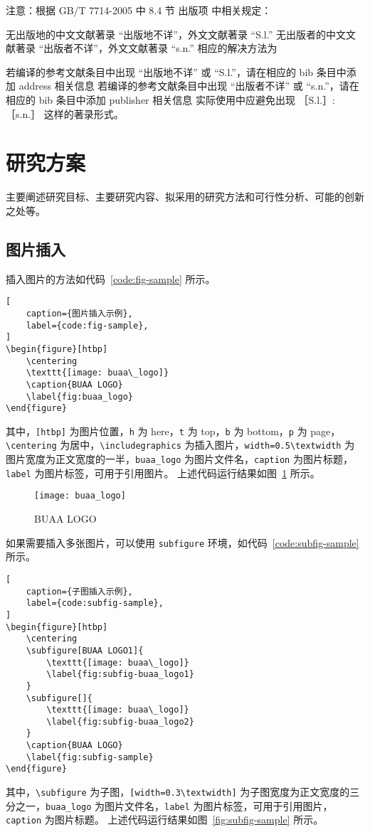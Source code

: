 \documentclass[master,AutoFakeBold=true]{buaathesisproposal}
\begin{document}
注意：根据 GB/T 7714-2005 中 8.4 节 出版项  中相关规定：

无出版地的中文文献著录 “出版地不详”，外文文献著录 “S.l.”
无出版者的中文文献著录 “出版者不详”，外文文献著录 “s.n.”
相应的解决方法为

若编译的参考文献条目中出现 “出版地不详” 或 “S.l.”，请在相应的 bib 条目中添加 address 相关信息
若编译的参考文献条目中出现 “出版者不详” 或 “s.n.”，请在相应的 bib 条目中添加 publisher 相关信息
实际使用中应避免出现 ［S.l.］:［s.n.］ 这样的著录形式。

\section{研究方案}
主要阐述研究目标、主要研究内容、拟采用的研究方法和可行性分析、可能的创新之处等。

\subsection{图片插入}

插入图片的方法如代码~\ref{code:fig-sample} 所示。
\begin{lstlisting}[
    caption={图片插入示例},
    label={code:fig-sample},
]
\begin{figure}[htbp]
    \centering
    \texttt{[image: buaa\_logo]}
    \caption{BUAA LOGO}
    \label{fig:buaa_logo}
\end{figure}
\end{lstlisting}
其中，\verb|[htbp]| 为图片位置，\verb|h| 为 here，\verb|t| 为 top，\verb|b| 为 bottom，\verb|p| 为 page，\verb|\centering| 为居中，\verb|\includegraphics| 为插入图片，\verb|width=0.5\textwidth| 为图片宽度为正文宽度的一半，\verb|buaa_logo| 为图片文件名，\verb|caption| 为图片标题，\verb|label| 为图片标签，可用于引用图片。
上述代码运行结果如图~\ref{fig:buaa_logo} 所示。

\begin{figure}[htbp]
    \centering
    \texttt{[image: buaa\_logo]}
    \caption{BUAA LOGO}
    \label{fig:buaa_logo}
\end{figure}


如果需要插入多张图片，可以使用 \verb|subfigure| 环境，如代码~\ref{code:subfig-sample} 所示。
\begin{lstlisting}[
    caption={子图插入示例},
    label={code:subfig-sample},
]
\begin{figure}[htbp]
    \centering
    \subfigure[BUAA LOGO1]{
        \texttt{[image: buaa\_logo]}
        \label{fig:subfig-buaa_logo1}
    }
    \subfigure[]{
        \texttt{[image: buaa\_logo]}
        \label{fig:subfig-buaa_logo2}
    }
    \caption{BUAA LOGO}
    \label{fig:subfig-sample}
\end{figure}
\end{lstlisting} 
其中，\verb|\subfigure| 为子图，\verb|[width=0.3\textwidth]| 为子图宽度为正文宽度的三分之一，\verb|buaa_logo| 为图片文件名，\verb|label| 为图片标签，可用于引用图片，\verb|caption| 为图片标题。
上述代码运行结果如图~\ref{fig:subfig-sample} 所示。
\end{document}
